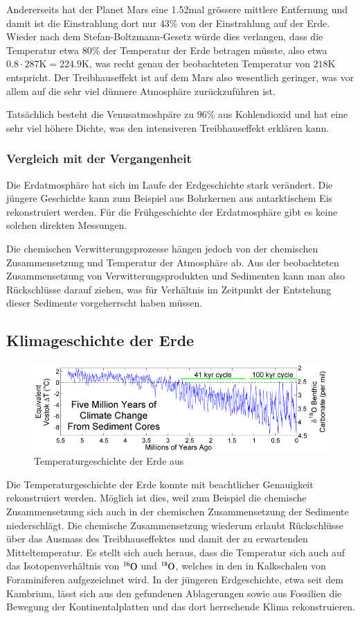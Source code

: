 Andererseits hat der Planet Mars eine 1.52mal grössere mittlere
Entfernung und damit ist die Einstrahlung dort nur 43\% von der
Einstrahlung auf der Erde.
Wieder nach dem Stefan-Boltzmann-Gesetz würde dies verlangen, dass die
Temperatur etwa 80\% der Temperatur der Erde betragen müsste,
also etwa $0.8\cdot 287\text{K} = 224.9\text{K}$, was recht genau
der beobachteten Temperatur von $218\text{K}$ entspricht.
Der Treibhauseffekt ist auf dem Mars also wesentlich geringer, was
vor allem auf die sehr viel dünnere Atmosphäre zurückzuführen ist.

Tatsächlich besteht die Venusatmoshpäre zu 96\% aus Kohlendioxid und
hat eine sehr viel höhere Dichte, was den intensiveren Treibhauseffekt
erklären kann.

\subsubsection{Vergleich mit der Vergangenheit}
Die Erdatmosphäre hat sich im Laufe der Erdgeschichte stark verändert.
Die jüngere Geschichte kann zum Beispiel aus Bohrkernen aus antarktischem
Eis rekonstruiert werden.
Für die Frühgeschichte der Erdatmosphäre gibt es keine solchen direkten
Messungen.

Die chemischen Verwitterungsprozesse hängen jedoch von der chemischen
Zusammensetzung und Temperatur der Atmosphäre ab.
Aus der beobachteten Zusammensetzung von Verwitterungsprodukten und
Sedimenten kann man also Rückschlüsse darauf ziehen, was für Verhältnis
im Zeitpunkt der Entstehung dieser Sedimente vorgeherrscht haben müssen.

\subsection{Klimageschichte der Erde\label{subsection:klimageschichte}}
\begin{figure}
\centering
\includegraphics[width=0.7\hsize]{chapters/1/FiveMyrClimateChange.png}
\caption{Temperaturgeschichte der Erde aus 
\cite{skript:geologictemperaturerecord}
\label{skript:history:temperatur}}
\end{figure}%
Die Temperaturgeschichte der Erde konnte mit beachtlicher
Genauigkeit rekonstruiert werden.
Möglich ist dies, weil zum Beispiel die chemische Zusammensetzung sich
auch in der chemischen Zusammensetzung der Sedimente niederschlägt.
Die chemische Zusammensetzung wiederum erlaubt Rückschlüsse über das
Ausmass des Treibhauseffektes und damit der zu erwartenden Mitteltemperatur.
Es stellt sich auch heraus, dass die Temperatur sich auch auf das
Isotopenverhältnis von $\mathstrut^{16}\text{O}$ und
$\mathstrut^{18}\text{O}$, welches in den in Kalkschalen von Foraminiferen
aufgezeichnet wird.
In der jüngeren Erdgeschichte, etwa seit dem Kambrium, lässt sich aus
den gefundenen Ablagerungen sowie aus Fossilien die Bewegung der
Kontinentalplatten und das dort herrschende Klima rekonstruieren.

